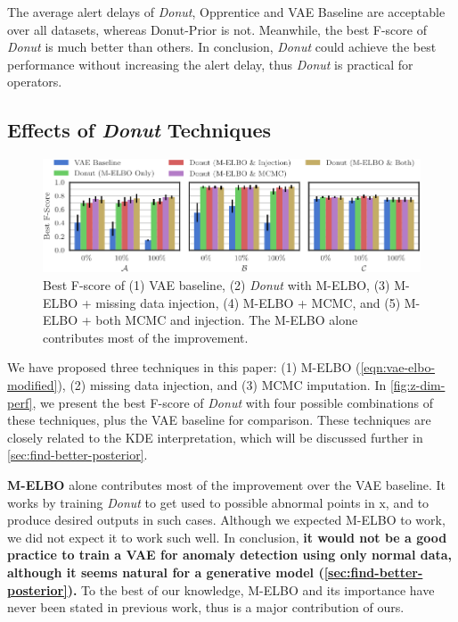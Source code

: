 \documentclass[sigconf]{acmart}
\newcommand{\DONUT}{\textit{Donut}}
\newcommand{\vv}[1]{\bm{\mathrm{{#1}}}}
\begin{document}
The average alert delays of \DONUT{}, Opprentice and VAE Baseline are acceptable over all datasets, whereas Donut-Prior is not.  Meanwhile, the best F-score of \DONUT{} is much better than others.  In conclusion, \DONUT{} could achieve the best performance without increasing the alert delay, thus \DONUT{} is practical for operators.


\subsection{Effects of \DONUT{} Techniques}
\label{sec:trick-effects}

\begin{figure}
	\centering
	\includegraphics[width=\columnwidth]{tricks_perf}
	\caption{
		Best F-score of (1) VAE baseline, (2) \DONUT{} with M-ELBO, (3) M-ELBO + missing data injection, (4) M-ELBO + MCMC, and (5) M-ELBO + both MCMC and injection.
		The M-ELBO alone contributes most of the improvement.
	}
	\label{fig:tricks-perf}
\end{figure}

We have proposed three techniques in this paper: (1) M-ELBO (\cref{eqn:vae-elbo-modified}), (2) missing data injection, and (3) MCMC imputation.
In \cref{fig:z-dim-perf}, we present the best F-score of \DONUT{} with four possible combinations of these techniques, plus the VAE baseline for comparison.
These techniques are closely related to the KDE interpretation, which will be discussed further in \cref{sec:find-better-posterior}.

\textbf{M-ELBO} alone contributes most of the improvement over the VAE baseline.
It works by training \DONUT{} to get used to possible abnormal points in $\vv{x}$, and to produce desired outputs in such cases.
Although we expected M-ELBO to work, we did not expect it to work such well.
In conclusion, \textbf{it would not be a good practice to train a VAE for anomaly detection using only normal data, although it seems natural for a generative model (\cref{sec:find-better-posterior}).}
To the best of our knowledge, M-ELBO and its importance have never been stated in previous work, thus is a major contribution of ours.
\end{document}
